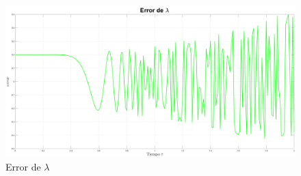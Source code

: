 \begin{figure}[H]
	\centering
	\includegraphics[width=150mm]{img/E3_ErrorLambda.png}
	\caption{Error de $\lambda$}
	\label{img:rossler7}
\end{figure}